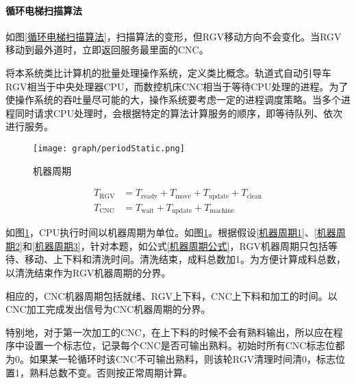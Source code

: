 			\paragraph{循环电梯扫描算法}如图\ref{循环电梯扫描算法}，扫描算法的变形，但RGV移动方向不会变化。当RGV移动到最外道时，立即返回服务最里面的CNC。
				\par\indent 将本系统类比计算机的批量处理操作系统\cite{石栋文瑾-399}，定义类比概念。轨道式自动引导车RGV相当于中央处理器CPU，而数控机床CNC相当于等待CPU处理的进程。为了使操作系统的吞吐量尽可能的大，操作系统要考虑一定的进程调度策略。当多个进程同时请求CPU处理时，会根据特定的算法计算服务的顺序，即等待队列、依次进行服务。
				\begin{figure}[htbp]
					\centering
					\caption{机器周期}
					\label{机器周期}
					\texttt{[image: graph/periodStatic.png]}
				\end{figure}
				\begin{align}
					\label{机器周期公式}
					T_\mathrm{RGV} & =T_\mathrm{ready}+T_\mathrm{move}+T_\mathrm{update}+T_\mathrm{clean} \\
					T_\mathrm{CNC} & =T_\mathrm{wait}+T_\mathrm{update}+T_\mathrm{machine}
				\end{align}
				\par\indent 如图\ref{机器周期}，CPU执行时间以机器周期为单位。如图\ref{机器周期}。根据假设\ref{机器周期1}、\ref{机器周期2}和\ref{机器周期3}，针对本题，如公式\ref{机器周期公式}，RGV机器周期只包括等待、移动、上下料和清洗时间。清洗结束，成料总数加1。为方便计算成料总数，以清洗结束作为RGV机器周期的分界。
				\par\indent 相应的，CNC机器周期包括就绪、RGV上下料，CNC上下料和加工的时间。以CNC加工完成发出信号为CNC机器周期的分界。
				\par\indent 特别地，对于第一次加工的CNC，在上下料的时候不会有熟料输出，所以应在程序中设置一个标志位，记录每个CNC是否可输出熟料。初始时所有CNC标志位都为0。如果某一轮循环时该CNC不可输出熟料，则该轮RGV清理时间清0，标志位置1，熟料总数不变。否则按正常周期计算。
